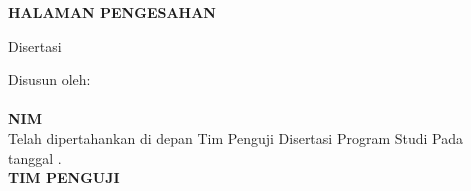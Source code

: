 
\newpage
{}
\begin{center}
        \textbf{\large \MakeUppercase{halaman pengesahan}}
\end{center}

\begin{center}
    Disertasi
\end{center}

\begin{center}
        \textbf{\large \MakeUppercase {\judulid}}
\end{center}

\begin{center}
    Disusun oleh:\\
    \textbf{\penulis}\\
    \textbf{NIM \nim}\\[1.5cm]

    Telah dipertahankan di depan Tim Penguji Disertasi Program Studi {\prodi} {\fakultas} {\universitas} Pada tanggal {\tglpengesahan}.\\[1cm]

    \textbf{\MakeUppercase{TIM PENGUJI}}
\end{center}

